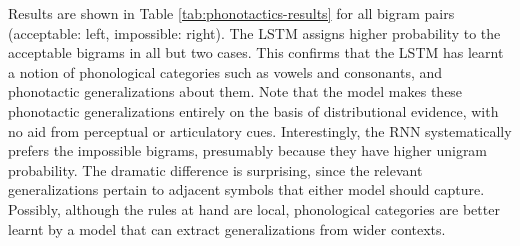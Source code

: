 Results are shown in Table \ref{tab:phonotactics-results} for all
bigram pairs (acceptable: left, impossible: right).  The LSTM 
assigns higher probability to the acceptable bigrams in all but two
cases.  This confirms that the LSTM  has learnt a notion of
phonological categories such as vowels and consonants, and phonotactic
generalizations about them.  Note that the model makes these
phonotactic generalizations entirely on the basis of distributional
evidence, with no aid from perceptual or articulatory
cues. Interestingly, the RNN  systematically prefers the
impossible bigrams, presumably because they have higher unigram
probability. The dramatic difference is surprising, since the relevant
generalizations pertain to adjacent symbols that either model should
capture. Possibly, although the rules at hand are local, phonological
categories are better learnt by a model that can extract
generalizations from wider contexts.

